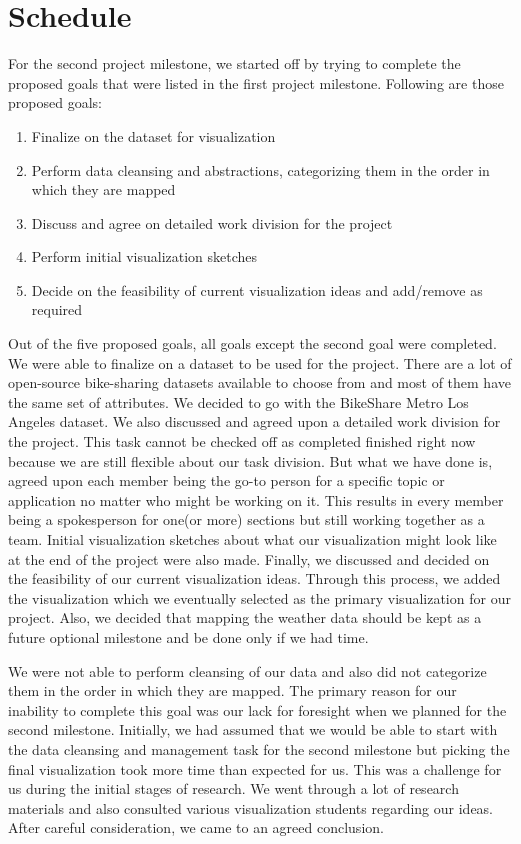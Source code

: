 \section{Schedule} 
\label{sec:schedule}

For the second project milestone, we started off by trying to complete the proposed goals that were listed in the first project milestone. Following are those proposed goals:
\begin{enumerate}
    \item Finalize on the dataset for visualization
    \item Perform data cleansing and abstractions, categorizing them in the order in which they are mapped
    \item Discuss and agree on detailed work division for the project
    \item Perform initial visualization sketches
    \item Decide on the feasibility of current visualization ideas and add/remove as required
\end{enumerate}

Out of the five proposed goals, all goals except the second goal were completed. We were able to finalize on a dataset to be used for the project. There are a lot of open-source bike-sharing datasets available to choose from and most of them have the same set of attributes. We decided to go with the BikeShare Metro Los Angeles dataset.
We also discussed and agreed upon a detailed work division for the project. This task cannot be checked off as completed finished right now because we are still flexible about our task division. But what we have done is, agreed upon each member being the go-to person for a specific topic or application no matter who might be working on it. This results in every member being a spokesperson for one(or more) sections but still working together as a team.
Initial visualization sketches about what our visualization might look like at the end of the project were also made. Finally, we discussed and decided on the feasibility of our current visualization ideas. Through this process, we added the visualization which we eventually selected as the primary visualization for our project. Also, we decided that mapping the weather data should be kept as a future optional milestone and be done only if we had time.

We were not able to perform cleansing of our data and also did not categorize them in the order in which they are mapped. The primary reason for our inability to complete this goal was our lack for foresight when we planned for the second milestone. Initially, we had assumed that we would be able to start with the data cleansing and management task for the second milestone but picking the final visualization took more time than expected for us. This was a challenge for us during the initial stages of research. We went through a lot of research materials and also consulted various visualization students regarding our ideas. After careful consideration, we came to an agreed conclusion.

